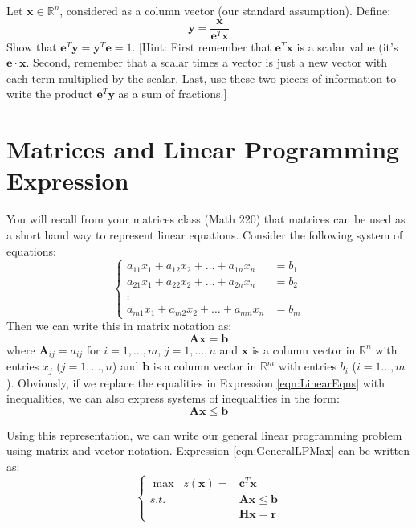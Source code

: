 \begin{exercise} Let $\mathbf{x} \in \mathbb{R}^n$, considered as a column vector (our standard assumption). Define:
\begin{displaymath}
\mathbf{y} = \frac{\mathbf{x}}{\mathbf{e}^T\mathbf{x}}
\end{displaymath}
Show that $\mathbf{e}^T\mathbf{y} = \mathbf{y}^T\mathbf{e} = 1$. [Hint: First remember that $\mathbf{e}^T\mathbf{x}$ is a scalar value (it's $\mathbf{e}\cdot\mathbf{x}$. Second, remember that a scalar times a vector is just a new vector with each term multiplied by the scalar. Last, use these two pieces of information to write the product $\mathbf{e}^T\mathbf{y}$ as a sum of fractions.]
\end{exercise}

\section{Matrices and Linear Programming Expression}
You will recall from your matrices class (Math 220) that matrices can be used as a short hand way to represent linear equations. Consider the following system of equations:
\begin{equation}
\left\{
\begin{aligned}
a_{11}x_1 + a_{12}x_2 + \dots + a_{1n}x_n & = b_1\\
a_{21}x_1 + a_{22}x_2 + \dots + a_{2n}x_n & = b_2\\
\vdots\\
a_{m1}x_1 + a_{m2}x_2 + \dots + a_{mn}x_n & = b_m
\end{aligned}\right.
\label{eqn:LinearEqns}
\end{equation}
Then we can write this in matrix notation as:
\begin{equation}
\mathbf{A}\mathbf{x} = \mathbf{b}
\end{equation}
where $\mathbf{A}_{ij} = a_{ij}$ for $i=1,\dots,m$, $j=1,\dots,n$ and $\mathbf{x}$ is a column vector in $\mathbb{R}^n$ with entries $x_j$ ($j=1,\dots,n$) and $\mathbf{b}$ is a column vector in $\mathbb{R}^m$ with entries $b_i$ ($i=1\dots,m$). Obviously, if we replace the equalities in Expression \ref{eqn:LinearEqns} with inequalities, we can also express systems of inequalities in the form:
\begin{equation}
\mathbf{A}\mathbf{x} \leq \mathbf{b}
\end{equation}

Using this representation, we can write our general linear programming problem using matrix and vector notation. Expression \ref{eqn:GeneralLPMax} can be written as:
\begin{equation}
\left\{
\begin{aligned}
\max\;\; z(\mathbf{x}) = &\mathbf{c}^T\mathbf{x}\\
s.t.\;\;&\mathbf{A}\mathbf{x} \leq \mathbf{b}\\
& \mathbf{H}\mathbf{x} = \mathbf{r}
\end{aligned}\right.
\label{eqn:GeneralLPMaxMatrixForm}
\end{equation}

